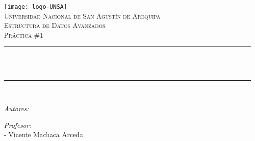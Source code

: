\begin{titlepage}

\centering
\texttt{[image: logo-UNSA]}\\[1.0 cm]
\textsc{\LARGE Universidad Nacional de San Agustín de Arequipa}\\[2.0 cm]
\textsc{\Large Estructura de Datos Avanzados}\\[0.5 cm]
\textsc{\large Práctica \#1}\\[0.5 cm]
\rule{\linewidth}{0.2 mm} \\[0.4 cm]
{ \huge \bfseries \thetitle}\\
\rule{\linewidth}{0.2 mm} \\[1.5 cm]

\begin{flushleft} \large
  \emph{Autores:}\\
\theauthor
\end{flushleft}

\begin{flushleft} \large
  \emph{Profesor:}\\
  - Vicente Machaca Arceda \\
\end{flushleft}

\vfill

{\large \thedate}

\end{titlepage}

